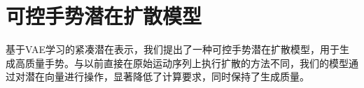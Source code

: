 \section{可控手势潜在扩散模型}
\label{sec:method:gld}
基于VAE学习的紧凑潜在表示，我们提出了一种可控手势潜在扩散模型，用于生成高质量手势。与以前直接在原始运动序列上执行扩散的方法不同，我们的模型通过对潜在向量进行操作，显著降低了计算要求，同时保持了生成质量。

